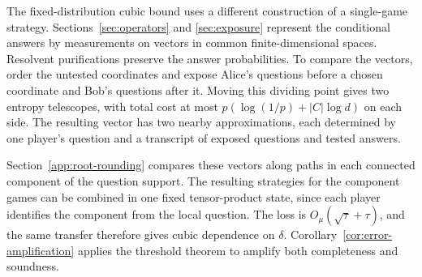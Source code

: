 The fixed-distribution cubic bound uses a different construction of a
single-game strategy. Sections~\ref{sec:operators} and
\ref{sec:exposure} represent the conditional answers by measurements on
vectors in common finite-dimensional spaces. Resolvent purifications
preserve the answer probabilities. To compare the vectors, order the
untested coordinates and expose Alice's questions before a chosen
coordinate and Bob's questions after it. Moving this dividing point
gives two entropy telescopes, with total cost at most
$p(\log(1/p)+|C|\log d)$ on each side. The resulting vector has two
nearby approximations, each determined by one player's question and a
transcript of exposed questions and tested answers.

Section~\ref{app:root-rounding} compares these vectors along paths in
each connected component of the question support. The resulting
strategies for the component games can be combined in one fixed
tensor-product state, since each player identifies the component from
the local question. The loss is $O_\mu(\sqrt\tau+\tau)$, and the same
transfer therefore gives cubic dependence on $\delta$.
Corollary~\ref{cor:error-amplification} applies the threshold theorem
to amplify both completeness and soundness.
